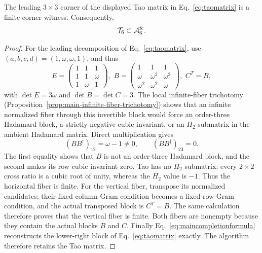 \begin{proposition}
\label{prop:tao-finite-corner}
The leading $3\times3$ corner of the displayed Tao matrix in
Eq.~\eqref{eq:taomatrix} is a finite-corner witness. Consequently,
\begin{equation}
\mathcal T_6\subset\mathcal A_6^{\mathrm{fc}}.
\label{eq:tao-finite-corner-main}
\end{equation}
\end{proposition}

\begin{proof}
For the leading decomposition of Eq.~\eqref{eq:taomatrix}, use
$(a,b,c,d)=(1,\omega,\omega,1)$, and thus
\begin{equation}
E=\begin{pmatrix}1&1&1\\1&1&\omega\\1&\omega&1\end{pmatrix}, 
\,\,
B=\begin{pmatrix}
1&1&1\\
\omega&\omega^2&\omega^2\\
\omega^2&\omega^2&\omega
\end{pmatrix},
\,\, C^T=B,
\label{eq:tao-seed-main}
\end{equation}
with $\det E=3\omega$ and $\det B=\det C=3$. The local infinite-fiber trichotomy (Proposition~\ref{prop:main-infinite-fiber-trichotomy}) shows that an infinite normalized fiber through this invertible block would force an order-three Hadamard block, a strictly negative cubic invariant, or an $H_2$ submatrix in the ambient Hadamard matrix. Direct multiplication gives
\begin{equation}
(BB^\dagger)_{12}=\omega-1\ne0,
\qquad
(BB^\dagger)_{23}=0.
\label{eq:tao-gram-check}
\end{equation}
The first equality shows that $B$ is not an order-three Hadamard block, and the second makes its row cubic invariant zero. Tao has no $H_2$ submatrix: every $2\times2$ cross ratio is a cubic root of unity, whereas the $H_2$ value is $-1$. Thus the horizontal fiber is finite. For the vertical fiber, transpose its normalized candidates: their fixed column-Gram condition becomes a fixed row-Gram condition, and the actual transposed block is $C^T=B$. The same calculation therefore proves that the vertical fiber is finite. Both fibers are nonempty because they contain the actual blocks $B$ and $C$. Finally Eq.~\eqref{eq:maincompletionformula} reconstructs the lower-right block of Eq.~\eqref{eq:taomatrix} exactly. The algorithm therefore retains the Tao matrix.
\end{proof}

